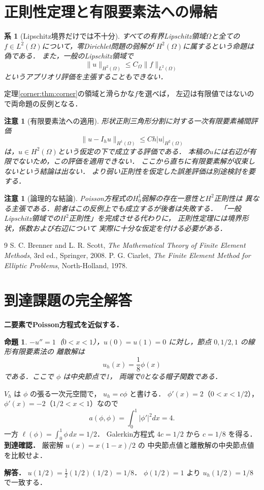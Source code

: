 \documentclass[a5paper,10pt,onecolumn]{jsarticle}
\makeatletter
\theoremstyle{mathnotetheorem}
\newtheorem{proposition}[theorem]{命題}
\newtheorem{corollary}[theorem]{系}
\newtheorem{remark}[theorem]{注意}
\renewcommand{\proofname}{証明}
\renewenvironment{proof}[1][\proofname]{%
  \par\pushQED{\qed}\normalfont\topsep4\p@\@plus2\p@\relax
  \trivlist\item[\hskip\labelsep\bfseries #1]\ignorespaces
}{\popQED\endtrivlist\@endpefalse}
\makeatother
\begin{document}
\section{正則性定理と有限要素法への帰結}
\begin{corollary}[Lipschitz境界だけでは不十分]
すべての有界Lipschitz領域$\Omega$と全ての
$f\in L^2(\Omega)$について，零Dirichlet問題の弱解が
$H^2(\Omega)$に属するという命題は偽である．
また，一般のLipschitz領域で
\[
 \|u\|_{H^2(\Omega)}\le C_\Omega\|f\|_{L^2(\Omega)}
\]
というアプリオリ評価を主張することもできない．
\end{corollary}
\begin{proof}
定理\ref{corner:thm:corner}の領域と滑らかな$f$を選べば，
左辺は有限値ではないので両命題の反例となる．
\end{proof}

\begin{remark}[有限要素法への適用]
形状正則三角形分割に対する一次有限要素補間評価
\[
 \|u-I_hu\|_{H^1(\Omega)}\le Ch|u|_{H^2(\Omega)}
\]
は，$u\in H^2(\Omega)$という仮定の下で成立する評価である．
本稿の$u$には右辺が有限でないため，この評価を適用できない．
ここから直ちに有限要素解が収束しないという結論は出ない．
より弱い正則性を仮定した誤差評価は別途検討を要する．
\end{remark}

\begin{remark}[論理的な結論]
Poisson方程式の$H_0^1$弱解の存在一意性と$H^2$正則性は
異なる主張である．前者はこの反例上でも成立するが後者は失敗する．
「一般Lipschitz領域での$H^2$正則性」を完成させる代わりに，
正則性定理には境界形状，係数および右辺について
実際に十分な仮定を付ける必要がある．
\end{remark}



\begin{thebibliography}{9}
 S. C. Brenner and L. R. Scott,
 \emph{The Mathematical Theory of Finite Element Methods},
 3rd ed., Springer, 2008.
 P. G. Ciarlet,
 \emph{The Finite Element Method for Elliptic Problems},
 North-Holland, 1978.
\end{thebibliography}


\section{到達課題の完全解答}
\noindent\textbf{二要素でPoisson方程式を近似する．}
\begin{proposition}
$-u''=1$（$0<x<1$），$u(0)=u(1)=0$
に対し，節点 $0,1/2,1$ の線形有限要素法の
離散解は
\[
u_h(x)=\frac18\phi(x)
\]
である．ここで $\phi$ は中央節点で1，
両端で0となる帽子関数である．
\end{proposition}
\begin{proof}
$V_h$ は $\phi$ の張る一次元空間で，
$u_h=c\phi$ と書ける．
$\phi'(x)=2$（$0<x<1/2$），
$\phi'(x)=-2$（$1/2<x<1$）なので
\[
a(\phi,\phi)=\int_0^1|\phi'|^2dx=4.
\]
一方
$\ell(\phi)=\int_0^1\phi\,dx=1/2$．
Galerkin方程式 $4c=1/2$ から $c=1/8$ を得る．
\end{proof}
\noindent\textbf{到達確認．}
厳密解 $u(x)=x(1-x)/2$ の
中央節点値と離散解の中央節点値を比較せよ．
\par\noindent\textbf{解答．}
$u(1/2)=\frac12(1/2)(1/2)=1/8$．
$\phi(1/2)=1$ より
$u_h(1/2)=1/8$ で一致する．
\end{document}
